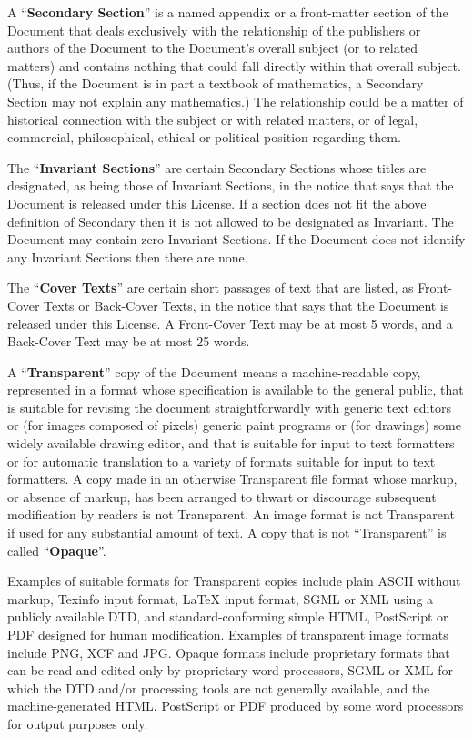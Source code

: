 \documentclass[]{report}
\theoremstyle{definition}
\theoremstyle{remark}
\theoremstyle{plain}
\numberwithin{equation}{chapter}
\begin{document}
\begin{multicols*}{2}
A ``\textbf{Secondary Section}'' is a named appendix or a front-matter section of
the Document that deals exclusively with the relationship of the
publishers or authors of the Document to the Document's overall subject
(or to related matters) and contains nothing that could fall directly
within that overall subject.  (Thus, if the Document is in part a
textbook of mathematics, a Secondary Section may not explain any
mathematics.)  The relationship could be a matter of historical
connection with the subject or with related matters, or of legal,
commercial, philosophical, ethical or political position regarding
them.

The ``\textbf{Invariant Sections}'' are certain Secondary Sections whose titles
are designated, as being those of Invariant Sections, in the notice
that says that the Document is released under this License.  If a
section does not fit the above definition of Secondary then it is not
allowed to be designated as Invariant.  The Document may contain zero
Invariant Sections.  If the Document does not identify any Invariant
Sections then there are none.

The ``\textbf{Cover Texts}'' are certain short passages of text that are listed,
as Front-Cover Texts or Back-Cover Texts, in the notice that says that
the Document is released under this License.  A Front-Cover Text may
be at most 5 words, and a Back-Cover Text may be at most 25 words.

A ``\textbf{Transparent}'' copy of the Document means a machine-readable copy,
represented in a format whose specification is available to the
general public, that is suitable for revising the document
straightforwardly with generic text editors or (for images composed of
pixels) generic paint programs or (for drawings) some widely available
drawing editor, and that is suitable for input to text formatters or
for automatic translation to a variety of formats suitable for input
to text formatters.  A copy made in an otherwise Transparent file
format whose markup, or absence of markup, has been arranged to thwart
or discourage subsequent modification by readers is not Transparent.
An image format is not Transparent if used for any substantial amount
of text.  A copy that is not ``Transparent'' is called ``\textbf{Opaque}''.

Examples of suitable formats for Transparent copies include plain
ASCII without markup, Texinfo input format, LaTeX input format, SGML
or XML using a publicly available DTD, and standard-conforming simple
HTML, PostScript or PDF designed for human modification.  Examples of
transparent image formats include PNG, XCF and JPG.  Opaque formats
include proprietary formats that can be read and edited only by
proprietary word processors, SGML or XML for which the DTD and/or
processing tools are not generally available, and the
machine-generated HTML, PostScript or PDF produced by some word
processors for output purposes only.


\end{multicols*}
\end{document}
